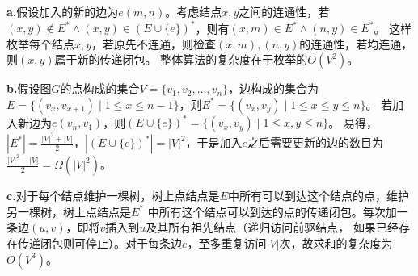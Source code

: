 \begin{solution}
    \textbf{a.}假设加入的新的边为$e(m,n)$。考虑结点$x,y$之间的连通性，若
    $(x,y)\notin E^* \wedge (x,y)\in (E\cup \{e\})^*$，则有$(x,m)\in E^* \wedge (n,y) \in E^*$。
    这样枚举每个结点$x,y$，若原先不连通，则检查$(x,m),(n,y)$的连通性，若均连通，则$(x,y)$属于新的传递闭包。
    整体算法的复杂度在于枚举的$O(V^2)$。

    \textbf{b.}假设图$G$的点构成的集合$V=\{v_1,v_2,\ldots,v_n\}$，边构成的集合为
    $E=\{(v_{x},v_{x+1})\mid 1 \le x \le n-1\}$，则$E^*=\{(v_{x},v_{y})\mid 1\le x \le y\le n\}$。
    若加入新边为$e(v_n,v_1)$，则$(E\cup\{e\})^*=\{(v_{x},v_{y})\mid 1\le x,y\le n\}$。
    易得，$|E^*|=\frac{|V|^2+|V|}{2}$，$|(E\cup\{e\})^*|=|V|^2$，于是加入$e$之后需要更新的边的数目为
    $\frac{|V|^2-|V|}{2}=\Omega(|V|^2)$。

    \textbf{c.}对于每个结点维护一棵树，树上点结点是$E$中所有可以到达这个结点的点，维护另一棵树，树上点结点是$E^*$
    中所有这个结点可以到达的点的传递闭包。每次加一条边$(u,v)$，即将$v$插入到$u$及其所有祖先结点（递归访问前驱结点，
    如果已经存在传递闭包则可停止）。对于每条边$e$，至多重复访问$|V|$次，故求和的复杂度为$O(V^3)$。

\end{solution}